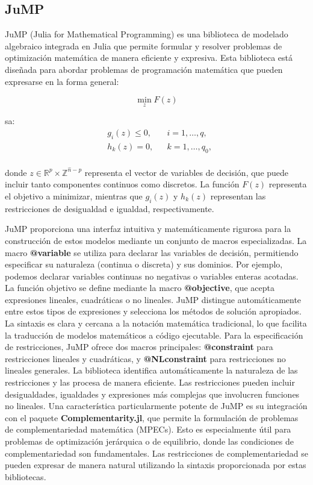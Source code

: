 \subsection*{JuMP}
JuMP (Julia for Mathematical Programming) es una biblioteca de modelado algebraico integrada en Julia que permite formular y resolver problemas de optimización matemática de manera eficiente y expresiva. Esta biblioteca está diseñada para abordar problemas de programación matemática que pueden expresarse en la forma general:

\begin{equation}
\min_{z} F(z)
\end{equation}

sa:
\begin{equation}
\begin{aligned}
    & g_i(z) \leq 0, && i = 1,\ldots,q,  \\
    & h_k(z)  = 0, && k = 1,\ldots,q_0,\\
\end{aligned}
\end{equation}

donde \(z \in \mathbb{R}^p \times \mathbb{Z}^{\hat{n}-p}\) representa el vector de variables de decisión, que puede incluir tanto componentes continuos como discretos. La función \(F(z)\) representa el objetivo a minimizar, mientras que \(g_i(z)\) y \(h_k(z)\) representan las restricciones de desigualdad e igualdad, respectivamente.

JuMP proporciona una interfaz intuitiva y matemáticamente rigurosa para la construcción de estos modelos mediante un conjunto de macros especializadas. La macro \textbf{@variable} se utiliza para declarar las variables de decisión, permitiendo especificar su naturaleza (continua o discreta) y sus dominios. Por ejemplo, podemos declarar variables continuas no negativas o variables enteras acotadas. La función objetivo se define mediante la macro \textbf{@objective}, que acepta expresiones lineales, cuadráticas o no lineales. JuMP distingue automáticamente entre estos tipos de expresiones y selecciona los métodos de solución apropiados. La sintaxis es clara y cercana a la notación matemática tradicional, lo que facilita la traducción de modelos matemáticos a código ejecutable. Para la especificación de restricciones, JuMP ofrece dos macros principales: \textbf{@constraint} para restricciones lineales y cuadráticas, y \textbf{@NLconstraint} para restricciones no lineales generales. La biblioteca identifica automáticamente la naturaleza de las restricciones y las procesa de manera eficiente. Las restricciones pueden incluir desigualdades, igualdades y expresiones más complejas que involucren funciones no lineales. Una característica particularmente potente de JuMP es su integración con el paquete \textbf{Complementarity.jl}, que permite la formulación de problemas de complementariedad matemática (MPECs). Esto es especialmente útil para problemas de optimización jerárquica o de equilibrio, donde las condiciones de complementariedad son fundamentales. Las restricciones de complementariedad se pueden expresar de manera natural utilizando la sintaxis proporcionada por estas bibliotecas.

